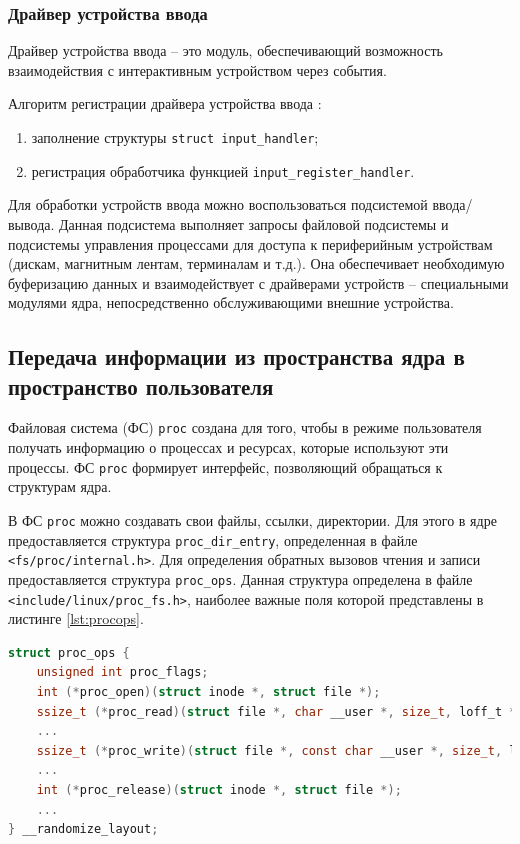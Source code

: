 \subsubsection{Драйвер устройства ввода}

Драйвер устройства ввода -- это модуль, обеспечивающий возможность взаимодействия с интерактивным устройством через события.

Алгоритм регистрации драйвера устройства ввода \cite{docs}: 
\begin{enumerate}
	\item заполнение структуры \texttt{struct input\_handler};
	\item регистрация обработчика функцией \texttt{input\_register\_handler}. 
\end{enumerate}

Для обработки устройств ввода можно воспользоваться подсистемой ввода/вывода. Данная подсистема выполняет запросы файловой подсистемы и подсистемы управления процессами для доступа к периферийным устройствам (дискам, магнитным лентам, терминалам и т.д.). Она обеспечивает необходимую буферизацию данных и взаимодействует с драйверами устройств -- специальными модулями ядра, непосредственно обслуживающими внешние устройства.

\subsection{Передача информации из пространства ядра в пространство пользователя}

Файловая система (ФС) \texttt{proc} создана для того, чтобы в режиме пользователя получать информацию о процессах и ресурсах, которые используют эти процессы. ФС \texttt{proc} формирует интерфейс, позволяющий обращаться к структурам ядра.

В ФС \texttt{proc} можно создавать свои файлы, ссылки, директории. Для этого в ядре предоставляется структура \texttt{proc\_dir\_entry}, определенная в файле \texttt{<fs/proc/internal.h>}. Для определения обратных вызовов чтения и записи предоставляется структура \texttt{proc\_ops}. Данная структура определена в файле
\texttt{<include/linux/proc\_fs.h>}, наиболее важные поля которой представлены в листинге \ref{lst:procops}.

\begin{lstlisting}[label=lst:procops,caption=Структура proc\_ops, language=c]
struct proc_ops {
	unsigned int proc_flags;
	int	(*proc_open)(struct inode *, struct file *);
	ssize_t	(*proc_read)(struct file *, char __user *, size_t, loff_t *);
	...
	ssize_t	(*proc_write)(struct file *, const char __user *, size_t, loff_t *);
	...
	int	(*proc_release)(struct inode *, struct file *);
	...
} __randomize_layout;
\end{lstlisting}

